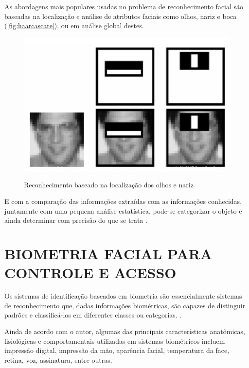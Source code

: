 As abordagens mais populares usadas no problema de reconhecimento facial são 
baseadas na localização e análise de atributos faciais como olhos, nariz e boca (\autoref{fig:haarcascate}), 
ou em análise global destes.

\begin{figure}[h!]
    \centering
    \caption{Reconhecimento baseado na localização dos olhos e nariz}
    \includegraphics[scale=0.25]{figuras/haarcascate.png}
    \label{fig:haarcascate}
    \centering
\end{figure}

E com a comparação das informações extraídas com as informações
conhecidas, juntamente com uma pequena análise estatística, pode-se categorizar o
objeto e ainda determinar com precisão do que se trata \cite{gonzalez2010}.

\section{BIOMETRIA FACIAL PARA CONTROLE E ACESSO}\label{sec:formatacaoTexto}

Os sistemas de identificação baseados em biometria são essencialmente sistemas de 
reconhecimento que, dadas informações biométricas, são capazes de distinguir padrões e 
classificá-los em diferentes classes ou categorias.  \cite{morais2010}.

Ainda de acordo com o autor, algumas das principais características anatômicas, 
fisiológicas e comportamentais utilizadas em sistemas biométricos incluem 
impressão digital, impressão da mão, aparência facial, temperatura da face, 
retina, voz, assinatura, entre outras.

